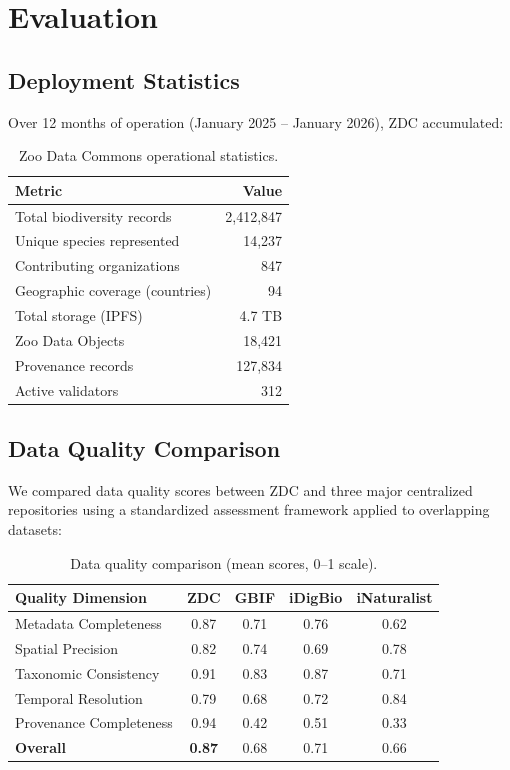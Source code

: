 \section{Evaluation}

\label{sec:evaluation}

\subsection{Deployment Statistics}

Over 12 months of operation (January 2025 -- January 2026), ZDC accumulated:

\begin{table}[H]
\centering
\caption{Zoo Data Commons operational statistics.}
\label{tab:stats}
\begin{tabular}{@{}lr@{}}
\toprule
\textbf{Metric} & \textbf{Value} \\
\midrule
Total biodiversity records & 2,412,847 \\
Unique species represented & 14,237 \\
Contributing organizations & 847 \\
Geographic coverage (countries) & 94 \\
Total storage (IPFS) & 4.7 TB \\
Zoo Data Objects & 18,421 \\
Provenance records & 127,834 \\
Active validators & 312 \\
\bottomrule
\end{tabular}
\end{table}

\subsection{Data Quality Comparison}

We compared data quality scores between ZDC and three major centralized repositories using a standardized assessment framework applied to overlapping datasets:

\begin{table}[H]
\centering
\caption{Data quality comparison (mean scores, 0--1 scale).}
\label{tab:quality_comparison}
\begin{tabular}{@{}lcccc@{}}
\toprule
\textbf{Quality Dimension} & \textbf{ZDC} & \textbf{GBIF} & \textbf{iDigBio} & \textbf{iNaturalist} \\
\midrule
Metadata Completeness & 0.87 & 0.71 & 0.76 & 0.62 \\
Spatial Precision & 0.82 & 0.74 & 0.69 & 0.78 \\
Taxonomic Consistency & 0.91 & 0.83 & 0.87 & 0.71 \\
Temporal Resolution & 0.79 & 0.68 & 0.72 & 0.84 \\
Provenance Completeness & 0.94 & 0.42 & 0.51 & 0.33 \\
\midrule
\textbf{Overall} & \textbf{0.87} & 0.68 & 0.71 & 0.66 \\
\bottomrule
\end{tabular}
\end{table}

